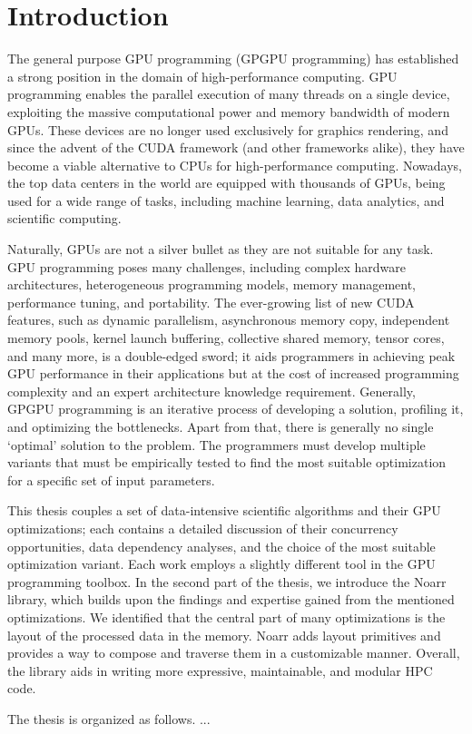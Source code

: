 \chapter{Introduction}

The general purpose GPU programming (GPGPU programming) has established a strong position in the domain of high-performance computing. 
GPU programming enables the parallel execution of many threads on a single device, exploiting the massive computational power and memory bandwidth of modern GPUs. 
These devices are no longer used exclusively for graphics rendering, and since the advent of the CUDA framework (and other frameworks alike), they have become a viable alternative to CPUs for high-performance computing.
Nowadays, the top data centers in the world are equipped with thousands of GPUs, being used for a wide range of tasks, including machine learning, data analytics, and scientific computing.

Naturally, GPUs are not a silver bullet as they are not suitable for any task. 
GPU programming poses many challenges, including complex hardware architectures, heterogeneous programming models, memory management, performance tuning, and portability.
The ever-growing list of new CUDA features, such as dynamic parallelism, asynchronous memory copy, independent memory pools, kernel launch buffering, collective shared memory, tensor cores, and many more, is a double-edged sword; 
it aids programmers in achieving peak GPU performance in their applications but at the cost of increased programming complexity and an expert architecture knowledge requirement.
Generally, GPGPU programming is an iterative process of developing a solution, profiling it, and optimizing the bottlenecks.
Apart from that, there is generally no single `optimal' solution to the problem. The programmers must develop multiple variants that must be empirically tested to find the most suitable optimization for a specific set of input parameters.

This thesis couples a set of data-intensive scientific algorithms and their GPU optimizations; each contains a detailed discussion of their concurrency opportunities, data dependency analyses, and the choice of the most suitable optimization variant. Each work employs a slightly different tool in the GPU programming toolbox. 
In the second part of the thesis, we introduce the Noarr library, which builds upon the findings and expertise gained from the mentioned optimizations. We identified that the central part of many optimizations is the layout of the processed data in the memory. 
Noarr adds layout primitives and provides a way to compose and traverse them in a customizable manner. Overall, the library aids in writing more expressive, maintainable, and modular HPC code.

The thesis is organized as follows. ...